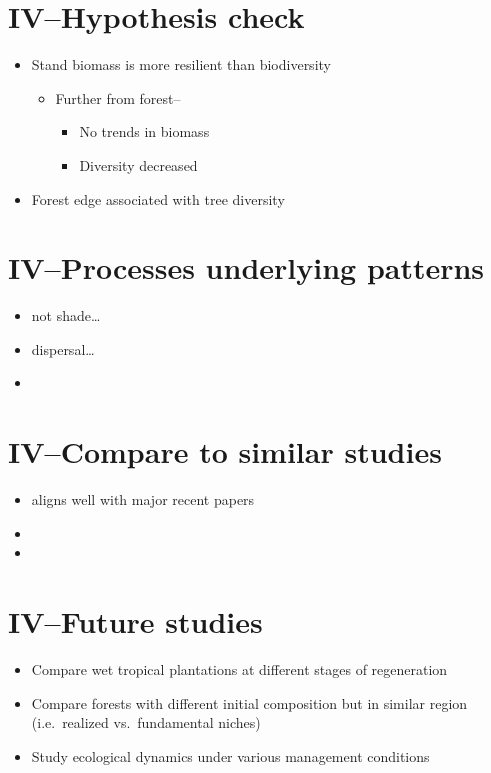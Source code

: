 \documentclass[
]{article}
\begin{document}
\hypertarget{ivhypothesis-check}{%
\section{IV--Hypothesis check}\label{ivhypothesis-check}}

\begin{itemize}
\item
  Stand biomass is more resilient than biodiversity

  \begin{itemize}
  \item
    Further from forest--

    \begin{itemize}
    \item
      No trends in biomass
    \item
      Diversity decreased
    \end{itemize}
  \end{itemize}
\item
  Forest edge associated with tree diversity
\end{itemize}

\hypertarget{ivprocesses-underlying-patterns}{%
\section{IV--Processes underlying
patterns}\label{ivprocesses-underlying-patterns}}

\begin{itemize}
\item
  not shade\ldots{}
\item
  dispersal\ldots{}
\item
\end{itemize}

\hypertarget{ivcompare-to-similar-studies}{%
\section{IV--Compare to similar
studies}\label{ivcompare-to-similar-studies}}

\begin{itemize}
\item
  aligns well with major recent papers
\item
\item
\end{itemize}

\hypertarget{ivfuture-studies}{%
\section{IV--Future studies}\label{ivfuture-studies}}

\begin{itemize}
\item
  Compare wet tropical plantations at different stages of regeneration
\item
  Compare forests with different initial composition but in similar
  region (i.e.~realized vs.~fundamental niches)
\item
  Study ecological dynamics under various management conditions
\end{itemize}
\end{document}
